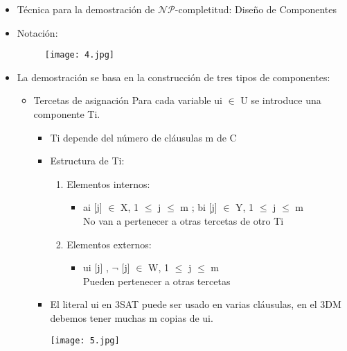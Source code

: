 \documentclass[a4paper,10pt]{article}
\begin{document}
		
		\begin{itemize}
			\item Técnica para la demostración de $\mathcal{NP}$-completitud: Diseño de Componentes
			\item Notación: 
			\begin{figure}[h!]
				\texttt{[image: 4.jpg]}
			\end{figure}
			\item La demostración se basa en la construcción de tres tipos de componentes:
				\begin{itemize}
					\item Tercetas de asignación
					Para cada variable ui $\in$ U se introduce una componente Ti. 
						\begin{itemize}
							\item Ti depende del número de cláusulas m de C 
							\item Estructura de Ti: 
							\begin{enumerate}
								\item Elementos internos: 
									\begin{itemize}
										\item ai [j] $\in$ X, 1 $\leq$ j $\leq$ m ; bi [j] $\in$ Y, 1 $\leq$ j $\leq$ m 
										 \\No van a pertenecer a otras tercetas de otro Ti 
									 \end{itemize}
								\item Elementos externos: 
								\begin{itemize}
										\item ui [j] , $\neg$ [j] $\in$ W, 1 $\leq$ j $\leq$ m 									
										\\Pueden pertenecer a otras tercetas 
								\end{itemize}
							\end{enumerate}
							\item El literal ui en 3SAT puede ser usado en varias cláusulas, en el 3DM debemos tener muchas m copias de ui.
							
								\texttt{[image: 5.jpg]}
							

\end{itemize}
\end{itemize}
\end{itemize}
\end{document}
